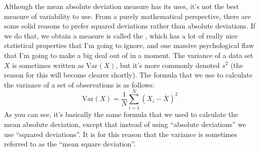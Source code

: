 


Although the mean absolute deviation measure has its uses, it's not the best measure of variability to use. From a purely mathematical perspective, there are some solid reasons to prefer squared deviations rather than absolute deviations. If we do that, we obtain a measure is called the , which has a lot of really nice statistical properties that I'm going to ignore, and one massive psychological flaw that I'm going to make a big deal out of in a moment. The variance of a data set $X$ is sometimes written as $\mbox{Var}(X)$, but it's more commonly denoted $s^2$ (the reason for this will become clearer shortly). The formula that we use to calculate the variance of a set of observations is as follows:
$$
\mbox{Var}(X) = \frac{1}{N} \sum_{i=1}^N \left( X_i - \bar{X} \right)^2
$$
As you can see, it's basically the same formula that we used to calculate the mean absolute deviation, except that instead of using ``absolute deviations'' we use ``squared deviations''. It is for this reason that the variance is sometimes referred to as the ``mean square deviation''.

